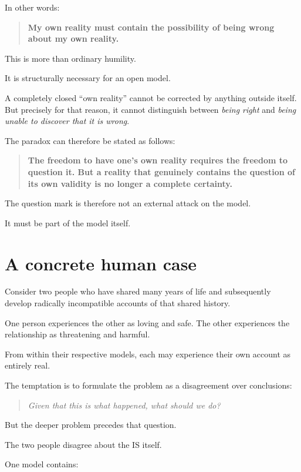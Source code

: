 \documentclass{article}
\begin{document}
In other words:

\begin{quote}
    \textbf{My own reality must contain the possibility of being wrong about my own reality.}
\end{quote}

This is more than ordinary humility.

It is structurally necessary for an open model.

A completely closed ``own reality'' cannot be corrected by anything outside itself. But precisely for that reason, it cannot distinguish between \textit{being right} and \textit{being unable to discover that it is wrong}.

The paradox can therefore be stated as follows:

\begin{quote}
    \textbf{The freedom to have one's own reality requires the freedom to question it. But a reality that genuinely contains the question of its own validity is no longer a complete certainty.}
\end{quote}

The question mark is therefore not an external attack on the model.

It must be part of the model itself.

\section*{A concrete human case}

Consider two people who have shared many years of life and subsequently develop radically incompatible accounts of that shared history.

One person experiences the other as loving and safe. The other experiences the relationship as threatening and harmful.

From within their respective models, each may experience their own account as entirely real.

The temptation is to formulate the problem as a disagreement over conclusions:

\begin{quote}
    \textit{Given that this is what happened, what should we do?}
\end{quote}

But the deeper problem precedes that question.

The two people disagree about the IS itself.

One model contains:
\end{document}
